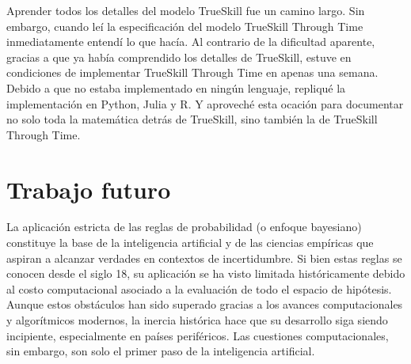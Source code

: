 \documentclass[a4paper,11pt]{book}
\theoremstyle{definition}
\begin{document}
Aprender todos los detalles del modelo TrueSkill fue un camino largo.
%
Sin embargo, cuando le\'i la especificaci\'on del modelo TrueSkill Through Time~\cite{Dangauthier2007} inmediatamente entend\'i lo que hac\'ia.
%
Al contrario de la dificultad aparente, gracias a que ya hab\'ia comprendido los detalles de TrueSkill, estuve en condiciones de implementar TrueSkill Through Time en apenas una semana.
%
Debido a que no estaba implementado en ning\'un lenguaje, repliqu\'e la implementaci\'on en Python, Julia y R.
%
Y aprovech\'e esta ocaci\'on para documentar no solo toda la matem\'atica detr\'as de TrueSkill, sino tambi\'en la de TrueSkill Through Time.


























































\chapter{Trabajo futuro} \label{ch_volverAlFuturo}

La aplicaci\'on estricta de las reglas de probabilidad (o enfoque bayesiano) constituye la base de la inteligencia artificial y de las ciencias emp\'iricas que aspiran a alcanzar verdades en contextos de incertidumbre.
%
Si bien estas reglas se conocen desde el siglo 18, su aplicaci\'on se ha visto limitada hist\'oricamente debido al costo computacional asociado a la evaluaci\'on de todo el espacio de hip\'otesis.
%
Aunque estos obst\'aculos han sido superado gracias a los avances computacionales y algor\'itmicos modernos, la inercia hist\'orica hace que su desarrollo siga siendo incipiente, especialmente en pa\'ises perif\'ericos.
%
Las cuestiones computacionales, sin embargo, son solo el primer paso de la inteligencia artificial.
\end{document}
